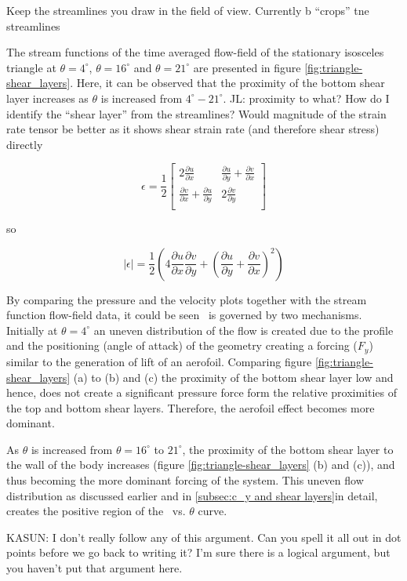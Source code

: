 Keep the streamlines you draw in the field of view. Currently b ``crops'' tne streamlines

The stream functions of the time averaged flow-field of the stationary isosceles triangle at  $\theta=4^{\circ}$, $\theta=16^{\circ}$ and $\theta=21^{\circ}$ are presented in figure \ref{fig:triangle-shear_layers}. Here, it can be observed that the proximity of the bottom shear layer increases as $\theta$ is increased from $4^{\circ}-21^{\circ}$. JL: proximity to what? How do I identify the ``shear layer'' from the streamlines? Would magnitude of the strain rate tensor be better as it shows shear strain rate (and therefore shear stress) directly

\begin{equation}
\epsilon = \frac{1}{2}
\begin{bmatrix}
  2\frac{\partial u}{\partial x} & \frac{\partial u}{\partial y} + \frac{\partial v}{\partial x} \\
  \frac{\partial v}{\partial x} + \frac{\partial u}{\partial y} & 2\frac{\partial v}{\partial y} \\
\end{bmatrix}
\end{equation}

so

\begin{equation}
  |\epsilon| = \frac{1}{2}\left(4\frac{\partial u}{\partial x}\frac{\partial v}{\partial y} + \left(\frac{\partial u}{\partial y} + \frac{\partial v}{\partial x}\right)^2\right)
\end{equation}

By comparing the pressure and the velocity plots together with the stream function flow-field data, it could be seen \cy\ is governed by two mechanisms. Initially at $\theta= 4^{\circ}$ an uneven distribution of the flow is created due to the profile and the positioning (angle of attack) of the geometry creating a forcing ($F_{y}$) similar to the generation of lift of an aerofoil. Comparing figure \ref{fig:triangle-shear_layers} (a) to (b) and (c) the proximity of the bottom shear layer low and hence, does not create a significant pressure force form the relative proximities of the top and bottom shear layers. Therefore, the aerofoil effect becomes more dominant.  

As $\theta$ is increased from $\theta=16^{\circ}$ to $21^{\circ}$, the proximity of the bottom shear layer to the wall of the body increases (figure \ref{fig:triangle-shear_layers} (b) and (c)), and thus becoming the more dominant forcing of the system. This uneven flow distribution as discussed earlier and in \ref{subsec:c_y and shear layers}in detail, creates the positive region of the \cy\ vs. $\theta$ curve.

KASUN: I don't really follow any of this argument. Can you spell it all out in dot points before we go back to writing it? I'm sure there is a logical argument, but you haven't put that argument here.
 
 
 
 
 



